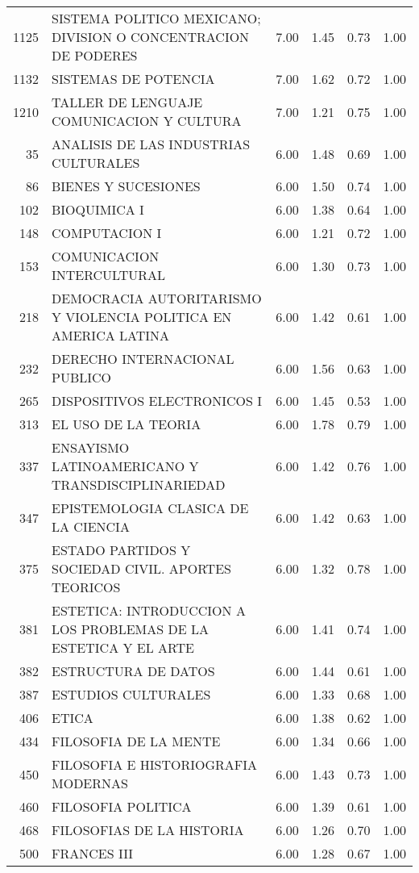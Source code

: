 \begin{table}[ht]
\begin{tabular}{rlrrrr}
  1125 & SISTEMA POLITICO MEXICANO; DIVISION O CONCENTRACION DE PODERES & 7.00 & 1.45 & 0.73 & 1.00 \\ 
  1132 & SISTEMAS DE POTENCIA & 7.00 & 1.62 & 0.72 & 1.00 \\ 
  1210 & TALLER DE LENGUAJE COMUNICACION Y CULTURA & 7.00 & 1.21 & 0.75 & 1.00 \\ 
  35 & ANALISIS DE LAS INDUSTRIAS CULTURALES & 6.00 & 1.48 & 0.69 & 1.00 \\ 
  86 & BIENES Y SUCESIONES & 6.00 & 1.50 & 0.74 & 1.00 \\ 
  102 & BIOQUIMICA I & 6.00 & 1.38 & 0.64 & 1.00 \\ 
  148 & COMPUTACION I & 6.00 & 1.21 & 0.72 & 1.00 \\ 
  153 & COMUNICACION INTERCULTURAL & 6.00 & 1.30 & 0.73 & 1.00 \\ 
  218 & DEMOCRACIA AUTORITARISMO Y VIOLENCIA POLITICA EN AMERICA LATINA & 6.00 & 1.42 & 0.61 & 1.00 \\ 
  232 & DERECHO INTERNACIONAL PUBLICO & 6.00 & 1.56 & 0.63 & 1.00 \\ 
  265 & DISPOSITIVOS ELECTRONICOS I & 6.00 & 1.45 & 0.53 & 1.00 \\ 
  313 & EL USO DE LA TEORIA & 6.00 & 1.78 & 0.79 & 1.00 \\ 
  337 & ENSAYISMO LATINOAMERICANO Y TRANSDISCIPLINARIEDAD & 6.00 & 1.42 & 0.76 & 1.00 \\ 
  347 & EPISTEMOLOGIA CLASICA DE LA CIENCIA & 6.00 & 1.42 & 0.63 & 1.00 \\ 
  375 & ESTADO PARTIDOS Y SOCIEDAD CIVIL. APORTES TEORICOS & 6.00 & 1.32 & 0.78 & 1.00 \\ 
  381 & ESTETICA: INTRODUCCION A LOS PROBLEMAS DE LA ESTETICA Y EL ARTE & 6.00 & 1.41 & 0.74 & 1.00 \\ 
  382 & ESTRUCTURA DE DATOS & 6.00 & 1.44 & 0.61 & 1.00 \\ 
  387 & ESTUDIOS CULTURALES & 6.00 & 1.33 & 0.68 & 1.00 \\ 
  406 & ETICA & 6.00 & 1.38 & 0.62 & 1.00 \\ 
  434 & FILOSOFIA DE LA MENTE & 6.00 & 1.34 & 0.66 & 1.00 \\ 
  450 & FILOSOFIA E HISTORIOGRAFIA MODERNAS & 6.00 & 1.43 & 0.73 & 1.00 \\ 
  460 & FILOSOFIA POLITICA & 6.00 & 1.39 & 0.61 & 1.00 \\ 
  468 & FILOSOFIAS DE LA HISTORIA & 6.00 & 1.26 & 0.70 & 1.00 \\ 
  500 & FRANCES III & 6.00 & 1.28 & 0.67 & 1.00 \\ 

\end{tabular}
\end{table}
